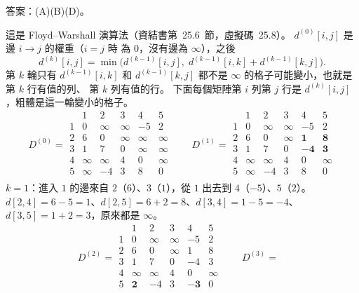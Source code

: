 \begin{pastsoln}
答案：(A)(B)(D)。

這是 Floyd--Warshall 演算法（資結書第~25.6~節，虛擬碼~25.8）。 $d^{(0)}[i, j]$ 是邊 $i \to j$ 的權重（$i = j$ 時
為 $0$，沒有邊為 $\infty$），之後
\[
d^{(k)}[i, j] = \min\bigl(d^{(k-1)}[i, j],\; d^{(k-1)}[i, k] + d^{(k-1)}[k, j]\bigr).
\]
第 $k$ 輪只有 $d^{(k-1)}[i, k]$ 和 $d^{(k-1)}[k, j]$ 都不是 $\infty$ 的格子可能變小，也就是第 $k$ 行有值的列、
第 $k$ 列有值的行。 下面每個矩陣第 $i$ 列第 $j$ 行是 $d^{(k)}[i, j]$，粗體是這一輪變小的格子。
\[
D^{(0)} = \begin{array}{c|rrrrr}
 & 1 & 2 & 3 & 4 & 5 \\ \hline
1 & 0 & \infty & \infty & -5 & 2 \\
2 & 6 & 0 & \infty & \infty & \infty \\
3 & 1 & 7 & 0 & \infty & \infty \\
4 & \infty & \infty & 4 & 0 & \infty \\
5 & \infty & -4 & 3 & 8 & 0 \\
\end{array}
\qquad
D^{(1)} = \begin{array}{c|rrrrr}
 & 1 & 2 & 3 & 4 & 5 \\ \hline
1 & 0 & \infty & \infty & -5 & 2 \\
2 & 6 & 0 & \infty & \mathbf{1} & \mathbf{8} \\
3 & 1 & 7 & 0 & \mathbf{-4} & \mathbf{3} \\
4 & \infty & \infty & 4 & 0 & \infty \\
5 & \infty & -4 & 3 & 8 & 0 \\
\end{array}
\]
\textbf{$k = 1$}：進入 $1$ 的邊來自 $2$（$6$）、$3$（$1$），從 $1$ 出去到 $4$（$-5$）、$5$（$2$）。
$d[2,4] = 6 - 5 = 1$、$d[2,5] = 6 + 2 = 8$、$d[3,4] = 1 - 5 = -4$、$d[3,5] = 1 + 2 = 3$，原來都是 $\infty$。
\[
D^{(2)} = \begin{array}{c|rrrrr}
 & 1 & 2 & 3 & 4 & 5 \\ \hline
1 & 0 & \infty & \infty & -5 & 2 \\
2 & 6 & 0 & \infty & 1 & 8 \\
3 & 1 & 7 & 0 & -4 & 3 \\
4 & \infty & \infty & 4 & 0 & \infty \\
5 & \mathbf{2} & -4 & 3 & \mathbf{-3} & 0 \\
\end{array}
\qquad
D^{(3)} = \begin{array}{c|rrrrr}

\end{array}\]
\end{pastsoln}
